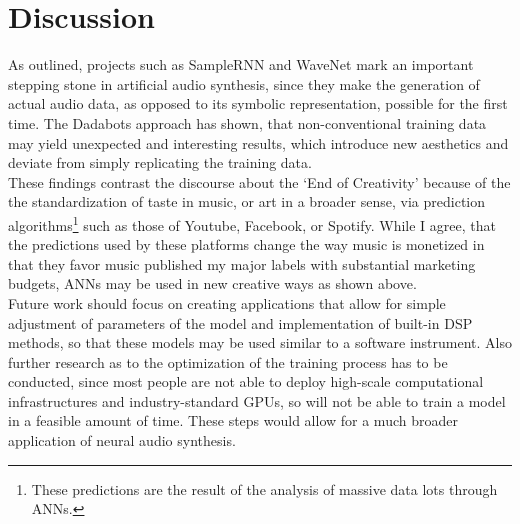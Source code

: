 \documentclass[a4paper, 11pt]{report}
\begin{document}
\chapter{Discussion}
As outlined, projects such as SampleRNN and WaveNet mark an important stepping 
stone in artificial audio synthesis, since they make the generation of actual 
audio data, as opposed to its symbolic representation, possible for the first 
time. The Dadabots approach has shown, that non-conventional training data may 
yield unexpected and interesting results, which introduce new aesthetics and 
deviate from simply replicating the training data. \\
These findings contrast the discourse about the ‘End of Creativity’\cite{chenne2018}
because 
of the the standardization of taste in music, or art in a broader sense, via 
prediction algorithms\footnote{
    These predictions are the result of the analysis of massive data lots 
    through ANNs. 
} such as those of Youtube, Facebook, or Spotify. While I 
agree, that the predictions used by these platforms change the way music is 
monetized in that they favor music published my major labels with substantial 
marketing budgets\cite{lindvall2009}, ANNs may be used in new creative ways 
as shown above. \\
Future work should focus on creating applications that allow for simple 
adjustment of parameters of the model and implementation of built-in DSP 
methods, so that these models may be used similar to a software instrument. 
Also further research as to the optimization of the training process has to 
be conducted, since most people are not able to deploy high-scale computational 
infrastructures and industry-standard GPUs, so will not be able to train a 
model in a feasible amount of time. These steps would allow for a much broader 
application of neural audio synthesis.   





\end{document}
